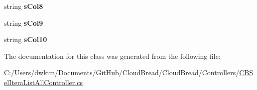 \begin{DoxyCompactItemize}
\item 
string {\bfseries s\+Col8}\hypertarget{class_cloud_bread_1_1_controllers_1_1_c_b_sel_item_list_all_controller_1_1_model_a6479917e648e1d19e60987f3a8c97439}{}\label{class_cloud_bread_1_1_controllers_1_1_c_b_sel_item_list_all_controller_1_1_model_a6479917e648e1d19e60987f3a8c97439}

\item 
string {\bfseries s\+Col9}\hypertarget{class_cloud_bread_1_1_controllers_1_1_c_b_sel_item_list_all_controller_1_1_model_a46ca0e869c33196c867790bf644e060f}{}\label{class_cloud_bread_1_1_controllers_1_1_c_b_sel_item_list_all_controller_1_1_model_a46ca0e869c33196c867790bf644e060f}

\item 
string {\bfseries s\+Col10}\hypertarget{class_cloud_bread_1_1_controllers_1_1_c_b_sel_item_list_all_controller_1_1_model_a39b2bba3ddcf42e377a7cee4e1a99168}{}\label{class_cloud_bread_1_1_controllers_1_1_c_b_sel_item_list_all_controller_1_1_model_a39b2bba3ddcf42e377a7cee4e1a99168}

\end{DoxyCompactItemize}


The documentation for this class was generated from the following file\+:\begin{DoxyCompactItemize}
\item 
C\+:/\+Users/dwkim/\+Documents/\+Git\+Hub/\+Cloud\+Bread/\+Cloud\+Bread/\+Controllers/\hyperlink{_c_b_sel_item_list_all_controller_8cs}{C\+B\+Sel\+Item\+List\+All\+Controller.\+cs}\end{DoxyCompactItemize}
